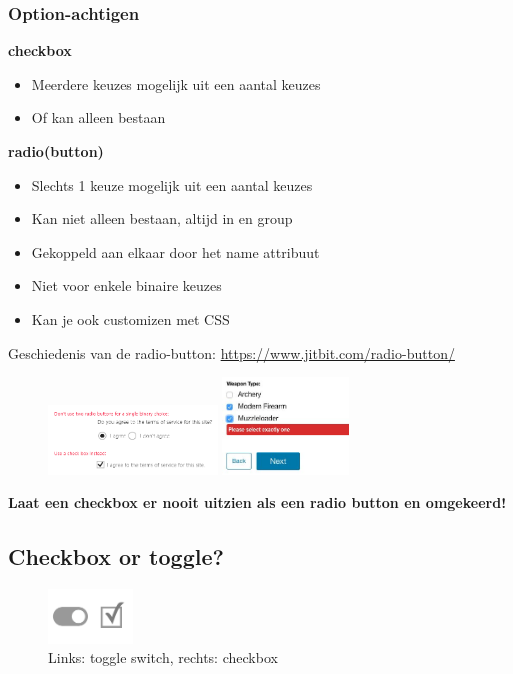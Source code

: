\documentclass{article}
\newcommand{\bold}[1]{\textbf{#1}}
\begin{document}
\subsubsection{Option-achtigen}

\bold{checkbox}

\begin{itemize}
    \item Meerdere keuzes mogelijk uit een aantal keuzes
    \item Of kan alleen bestaan
\end{itemize}

\bold{radio(button)}

\begin{itemize}
    \item Slechts 1 keuze mogelijk uit een aantal keuzes
    \item Kan niet alleen bestaan, altijd in en group
    \item Gekoppeld aan elkaar door het name attribuut
    \item Niet voor enkele binaire keuzes
    \item Kan je ook customizen met CSS
\end{itemize}

Geschiedenis van de radio-button: \url{https://www.jitbit.com/radio-button/}

\begin{figure}[H]
    \centering
    \includegraphics[width=0.4\textwidth]{radiobuttons.png}
    \includegraphics[width=0.3\textwidth]{checkboxes.png}
    \caption{}
\end{figure}

\bold{Laat een checkbox er nooit uitzien als een radio button en omgekeerd!}

\subsection{Checkbox or toggle?}
\begin{figure}[H]
    \centering
    \includegraphics[width=0.2\textwidth]{toggle-switch.png}
    \caption{Links: toggle switch, rechts: checkbox}
\end{figure}
\end{document}
